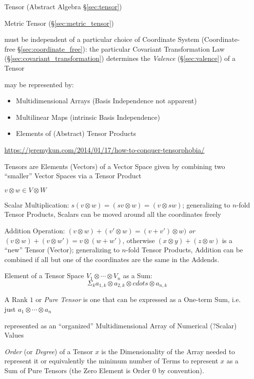 \fist Tensor (Abstract Algebra \S\ref{sec:tensor})

\fist Metric Tensor (\S\ref{sec:metric_tensor})

must be independent of a particular choice of Coordinate System
(Coordinate-free \S\ref{sec:coordinate_free}): the particular Covariant
Transformation Law (\S\ref{sec:covariant_transformation}) determines
the \emph{Valence} (\S\ref{sec:valence}) of a Tensor

may be represented by:
\begin{itemize}
  \item Multidimensional Arrays (Basis Independence not apparent)
  \item Multilinear Maps (intrinsic Basis Independence)
  \item Elements of (Abstract) Tensor Products
\end{itemize}

\fist
\url{https://jeremykun.com/2014/01/17/how-to-conquer-tensorphobia/}

Tensors are Elements (Vectors) of a Vector Space given by
combining two ``smaller'' Vector Spaces via a Tensor Product

$v \otimes w \in V \otimes W$

Scalar Multiplication: $s(v \otimes w) = (sv \otimes w) = (v \otimes
sw)$; generalizing to  $n$-fold Tensor Products, Scalars can be moved
around all the coordinates freely

Addition Operation: $(v \otimes w) + (v' \otimes w) = (v + v') \otimes
w)$ \emph{or} $(v \otimes w) + (v \otimes w') = v \otimes (w + w')$,
otherwise $(x \otimes y) + (z \otimes w)$ is a ``new'' Tensor
(Vector); generalizing to $n$-fold Tensor Products, Addition can be
combined if all but one of the coordinates are the same in the
Addends.

Element of a Tensor Space $V_1 \otimes \cdots \otimes V_n$ as a Sum:
\[
  \Sigma_k a_{1,k} \otimes a_{2,k} \otimes cdots \otimes a_{n,k}
\]

A Rank $1$ or \emph{Pure Tensor} is one that can be expressed as a
One-term Sum, i.e. just $a_1 \otimes \cdots \otimes a_n$


\asterism


represented as an ``organized'' Multidimensional Array of Numerical
(?Scalar) Values

\emph{Order} (or \emph{Degree}) of a Tensor $x$ is the
Dimensionality of the Array needed to represent it or equivalently the
minimum number of Terms to represent $x$ as a Sum of Pure Tensors (the
Zero Element is Order $0$ by convention).

